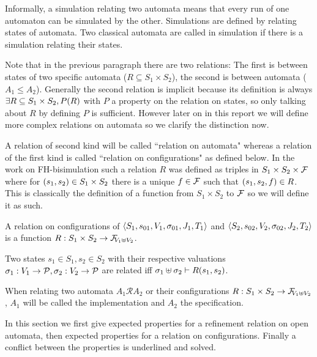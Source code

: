 \documentclass{article}
\begin{document}
Informally, a simulation relating two automata means that every run of one automaton can be simulated by the other.
Simulations are defined by relating states of automata.
Two classical automata are called in simulation if there is a simulation relating their states.

Note that in the previous paragraph there are two relations:
The first is between states of two specific automata (\(R \subseteq S_1 \times S_2\)), the second is between automata (\(A_1 \leq A_2\)).
Generally the second relation is implicit because its definition is always \(\exists R \subseteq S_1 \times S_2, P\mpar{R}\) with \(P\) a property on the relation on states, so only talking about \(R\) by defining \(P\) is sufficient.
However later on in this report we will define more complex relations on automata so we clarify the distinction now.

A relation of second kind will be called ``relation on automata" whereas a relation of the first kind is called ``relation on configurations" as defined below.
In the work on FH-bisimulation \cite{henrio:01055091} such a relation \(R\) was defined as triples in \(S_1 \times S_2 \times \formulas\) where for \(\mpar{s_1, s_2} \in S_1 \times S_2\) there is a unique \(f \in \formulas\) such that \(\mpar{s_1, s_2, f} \in R\).
This is classically the definition of a function from \(S_1 \times S_2\) to \(\formulas\) so we will define it as such.
\begin{defi}
A relation on configurations of \(\OAg[1]\) and \(\OAg[2]\) is a function \(R: S_1 \times S_2 \to \rformulas[V_1 \uplus V_2]\).

Two states \(s_1 \in S_1, s_2 \in S_2\) with their respective valuations \(\sigma_1: V_1 \to \values, \sigma_2: V_2 \to \values\) are related iff \(\sigma_1 \uplus \sigma_2 \vdash R\mpar{s_1, s_2}\).
\end{defi}
When relating two automata \(A_1 \mathrel{\mathcal{R}} A_2\) or their configurations \(R: S_1 \times S_2 \to \rformulas[V_1 \uplus V_2]\), \(A_1\) will be called the implementation and \(A_2\) the specification.

In this section we first give expected properties for a refinement relation on open automata, then expected properties for a relation on configurations.
Finally a conflict between the properties is underlined and solved.
\end{document}
